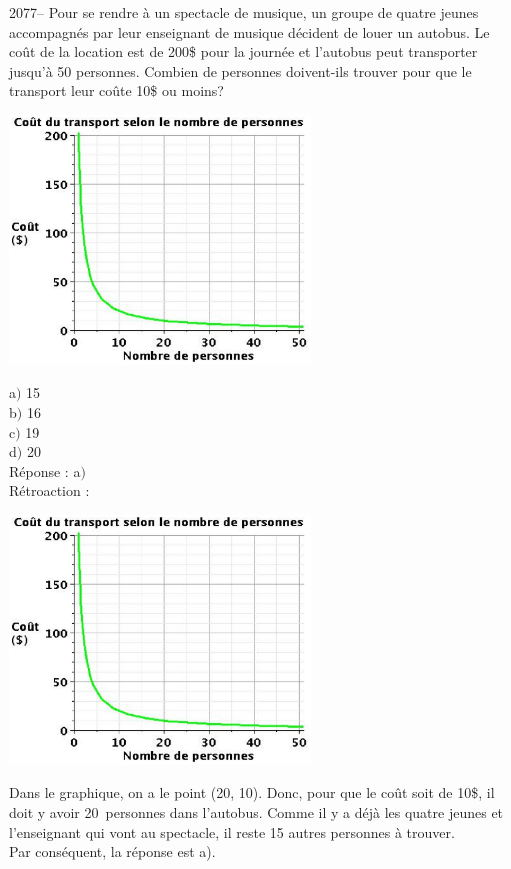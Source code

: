 \documentclass[letterpaper, 12pt]{article}
\begin{document}
2077-- Pour se rendre \`a un spectacle de musique, un groupe de quatre jeunes accompagn\'es par leur enseignant de musique d\'ecident de louer un autobus. Le co\^ut de la location est de 200\$ pour la journ\'ee et l'autobus peut transporter jusqu'\`a 50 personnes. Combien de personnes doivent-ils trouver pour que le transport leur co\^ute 10\$ ou moins?
\begin{center}
 \includegraphics[width=8cm,bb=14 14 497 415]{Q2077.eps}
\end{center}
a$)$ 15\\
b$)$ 16\\
c$)$ 19\\
d$)$ 20\\

R\'eponse : a$)$\\

R\'etroaction :
\begin{center}
 \includegraphics[width=8cm,bb=14 14 497 415]{Q2077.eps}
\end{center}
Dans le graphique, on a le point (20, 10). Donc, pour que le co\^ut soit de 10\$, il doit y avoir \mbox{20 personnes} dans l'autobus. Comme il y a d\'ej\`a les quatre jeunes et l'enseignant qui vont au spectacle, il reste 15 autres personnes \`a trouver. \\
Par cons\'equent, la r\'eponse est a).\\
\end{document}
